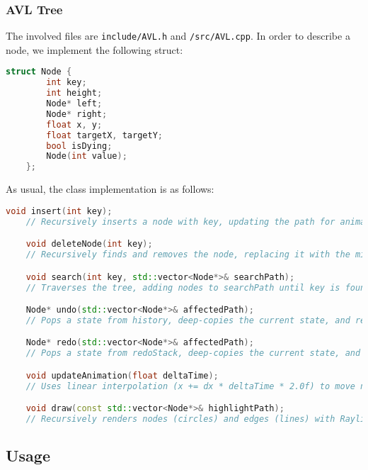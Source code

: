 \documentclass{article}
\begin{document}
\subsubsection{AVL Tree}
The involved files are \lstinline|include/AVL.h| and \lstinline|/src/AVL.cpp|. In order to describe a node, we implement the following struct:
\begin{lstlisting}[language=c++]
	struct Node {
		int key;
		int height;
		Node* left;
		Node* right;
		float x, y;
		float targetX, targetY;
		bool isDying;
		Node(int value);
	};
\end{lstlisting}
As usual, the class implementation is as follows:
\begin{lstlisting}[language=c++]
	void insert(int key);
	// Recursively inserts a node with key, updating the path for animation. Balances the tree using AVL rotations if the balance factor (getHeight(left) - getHeight(right)) exceeds 1 or -1.

	void deleteNode(int key);
	// Recursively finds and removes the node, replacing it with the minimum of the right subtree if it has two children, then rebalances.

	void search(int key, std::vector<Node*>& searchPath);
	// Traverses the tree, adding nodes to searchPath until key is found or traversal ends.

	Node* undo(std::vector<Node*>& affectedPath);
	// Pops a state from history, deep-copies the current state, and restores the previous state.

	Node* redo(std::vector<Node*>& affectedPath);
	// Pops a state from redoStack, deep-copies the current state, and restores the next state.

	void updateAnimation(float deltaTime);
	// Uses linear interpolation (x += dx * deltaTime * 2.0f) to move nodes from current (x, y) to target positions (targetX, targetY).

	void draw(const std::vector<Node*>& highlightPath);
	// Recursively renders nodes (circles) and edges (lines) with Raylib, highlighting nodes in highlightPath.
\end{lstlisting}

\subsection{Usage}
\end{document}
